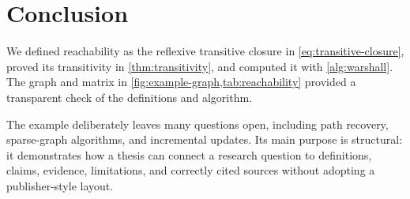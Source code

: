 \chapter{Conclusion}
\label{ch:conclusion}


We defined reachability as the reflexive transitive closure in
\cref{eq:transitive-closure}, proved its transitivity in
\cref{thm:transitivity}, and computed it with \cref{alg:warshall}. The graph and
matrix in \cref{fig:example-graph,tab:reachability} provided a transparent check
of the definitions and algorithm.

The example deliberately leaves many questions open, including path recovery,
sparse-graph algorithms, and incremental updates. Its main purpose is structural:
it demonstrates how a thesis can connect a research question to definitions,
claims, evidence, limitations, and correctly cited sources without adopting a
publisher-style layout.

